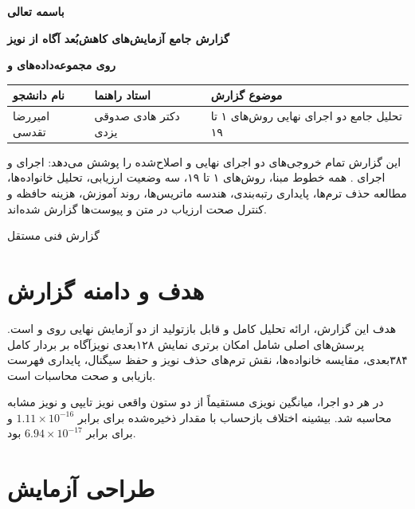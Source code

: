 \documentclass[a4paper,12pt]{article}
\begin{document}
\begin{titlepage}
\thispagestyle{empty}
\centering
\vspace*{1.6cm}
{\Large\bfseries باسمه تعالی\par}
\vspace{1.2cm}
{\Huge\bfseries گزارش جامع آزمایش‌های کاهش‌بُعد آگاه از نویز\par}
\vspace{0.6cm}
{\LARGE\bfseries روی مجموعه‌داده‌های  و \par}
\vspace{1.5cm}
\begin{tabular}{|C{4.2cm}|C{5cm}|C{5cm}|}
\hline
\textbf{نام دانشجو} & \textbf{استاد راهنما} & \textbf{موضوع گزارش} \\
\hline
امیررضا تقدسی & دکتر هادی صدوقی یزدی & تحلیل جامع دو اجرای نهایی روش‌های ۱ تا ۱۹ \\
\hline
\end{tabular}
\vspace{1.6cm}
\begin{minipage}{0.88\textwidth}
\centering
این گزارش تمام خروجی‌های دو اجرای نهایی و اصلاح‌شده را پوشش می‌دهد: اجرای  و اجرای . همه خطوط مبنا، روش‌های ۱ تا ۱۹، سه وضعیت ارزیابی، تحلیل خانواده‌ها، مطالعه حذف ترم‌ها، پایداری رتبه‌بندی، هندسه ماتریس‌ها، روند آموزش، هزینه حافظه و کنترل صحت ارزیاب در متن و پیوست‌ها گزارش شده‌اند.
\end{minipage}
\vfill
{\large گزارش فنی مستقل\par}
\end{titlepage}

\tableofcontents
\listoffigures
\listoftables
\newpage

\section{هدف و دامنه گزارش}
هدف این گزارش، ارائه تحلیل کامل و قابل بازتولید از دو آزمایش نهایی روی  و  است. پرسش‌های اصلی شامل امکان برتری نمایش ۱۲۸بعدی نویزآگاه بر بردار کامل ۳۸۴بعدی، مقایسه خانواده‌ها، نقش ترم‌های حذف نویز و حفظ سیگنال، پایداری فهرست بازیابی و صحت محاسبات است.

در هر دو اجرا، میانگین نویزی مستقیماً از دو ستون واقعی نویز تایپی و نویز مشابه  محاسبه شد. بیشینه اختلاف بازحساب با مقدار ذخیره‌شده برای  برابر $1.11\times10^{-16}$ و برای  برابر $6.94\times10^{-17}$ بود.

\section{طراحی آزمایش}
\end{document}
